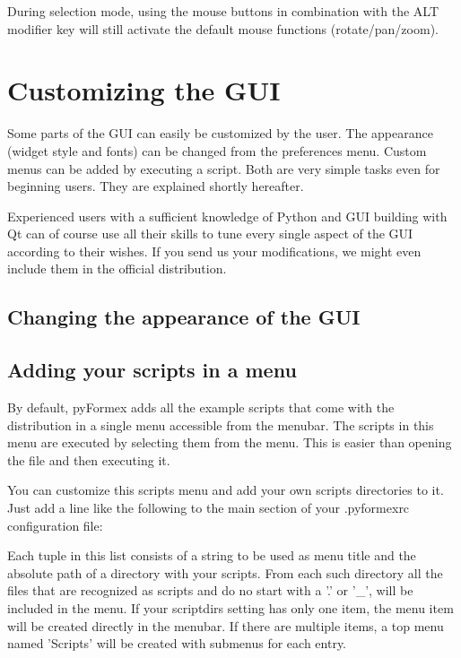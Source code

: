 During selection mode, using the mouse buttons in combination with the ALT modifier key will still activate the default mouse functions (rotate/pan/zoom). 




\section{Customizing the GUI}
\label{sec:customize-gui}

Some parts of the \pyformex GUI can easily be customized by the user. 
The appearance (widget style and fonts) can be changed from the preferences menu. Custom menus can be added by executing a script. Both are very simple tasks even for beginning users. They are explained shortly hereafter.

Experienced users with a sufficient knowledge of Python and GUI building with Qt can of course use all their skills to tune every single aspect of the \pyformex GUI according to their wishes. If you send us your modifications, we might even include them in the official distribution.


\subsection{Changing the appearance of the GUI}
\label{sec:chang-appe-gui}


\subsection{Adding your scripts in a menu}
\label{sec:adding-scripts-menu}
By default, pyFormex adds all the example scripts that come with the distribution in a single menu accessible from the menubar. The scripts in this menu are executed by selecting them from the menu. This is easier than opening the file and then executing it.

You can customize this scripts menu and add your own scripts directories to it.
Just add a line like the following to the main section of your .pyformexrc configuration file:\\

Each tuple in this list consists of a string to be used as menu title and the absolute path of a directory with your scripts. From each such directory all the files that are recognized as \pyformex scripts and do no start with a '.' or '_', will be included in the menu. If your scriptdirs setting has only one item, the menu item will be created directly in the menubar. If there are multiple items, a top menu named 'Scripts' will be created with submenus for each entry.

